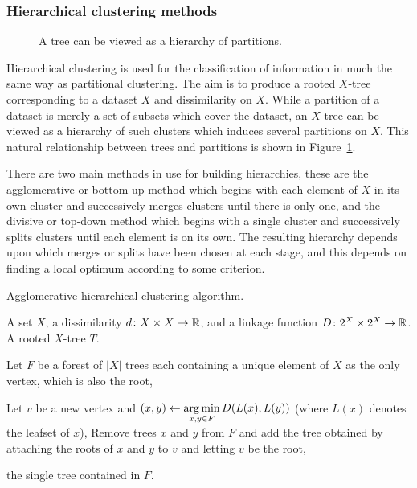 \subsubsection{Hierarchical clustering methods}
\label{sec:hier-clust-meth}

\begin{figure}
  \centering
  
  \caption{A tree can be viewed as a hierarchy of partitions.}
  \label{fig:tree-clust-ex}
\end{figure}

Hierarchical clustering is used for the classification of information in much
the same way as partitional clustering.  The aim is to produce a rooted
$X$-tree corresponding to a dataset $X$ and dissimilarity on $X$.  While a
partition of a dataset is merely a set of subsets which cover the dataset, an
$X$-tree can be viewed as a hierarchy of such clusters which induces several
partitions on $X$.  This natural relationship between trees and partitions is
shown in Figure~\ref{fig:tree-clust-ex}.

There are two main methods in use for building hierarchies, these are the
agglomerative or bottom-up method which begins with each element of $X$ in its
own cluster and successively merges clusters until there is only one, and the
divisive or top-down method which begins with a single cluster and
successively splits clusters until each element is on its own.  The resulting
hierarchy depends upon which merges or splits have been chosen at each stage,
and this depends on finding a local optimum according to some criterion.

\begin{algorithm}[h]
  \caption{Agglomerative hierarchical clustering algorithm.}
  \label{alg:agglomerative}

  \begin{algorithmic}
    \Require A set $X$, a dissimilarity $d \colon X \times X \to {\mathbb R}$, and a
    linkage function $D \colon 2^X \times 2^X \to {\mathbb R}$.
    \Ensure  A rooted $X$-tree $T$.

    \State Let $F$ be a forest of $|X|$ trees each containing a unique element
    of $X$ as the only vertex, which is also the root,


       \State Let $v$ be a new vertex and $\displaystyle (x,y) \gets \operatorname*{arg\,min}_{x,y
         \in F} D(L(x),L(y))$ (where $L(x)$ denotes the leafset of $x$),
       \State Remove trees $x$ and $y$ from $F$ and add the tree obtained by
         attaching the roots of $x$ and $y$ to $v$ and letting $v$ be the root,
    
    \EndWhile

    \State \Return the single tree contained in $F$.
    
  \end{algorithmic}
\end{algorithm}

